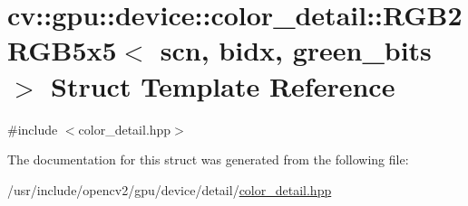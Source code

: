 \hypertarget{structcv_1_1gpu_1_1device_1_1color__detail_1_1RGB2RGB5x5}{\section{cv\-:\-:gpu\-:\-:device\-:\-:color\-\_\-detail\-:\-:R\-G\-B2\-R\-G\-B5x5$<$ scn, bidx, green\-\_\-bits $>$ Struct Template Reference}
\label{structcv_1_1gpu_1_1device_1_1color__detail_1_1RGB2RGB5x5}
}


{\ttfamily \#include $<$color\-\_\-detail.\-hpp$>$}



The documentation for this struct was generated from the following file\-:\begin{DoxyCompactItemize}
\item 
/usr/include/opencv2/gpu/device/detail/\hyperlink{color__detail_8hpp}{color\-\_\-detail.\-hpp}\end{DoxyCompactItemize}

